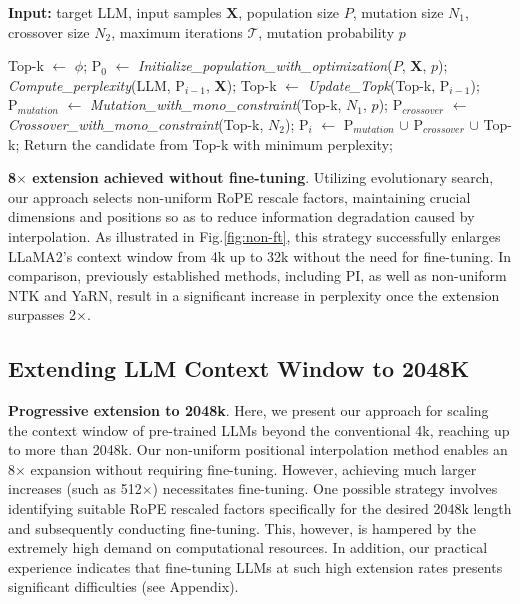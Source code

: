 \begin{algorithm}[t]
	\small
	\caption{The search algorithm}
	\textbf{Input:} target LLM, input samples $\mathbf{X}$, population size $P$, mutation size $N_1$, crossover size $N_2$, maximum iterations $\mathcal{T}$, mutation probability $p$ \\

	\begin{algorithmic}[1]
		\label{alg:search}
		\STATE Top-k $\leftarrow$ $\phi$;
		\STATE $\text{P}_0$ $\leftarrow$ \textit{Initialize\_population\_with\_optimization}($P$, $\mathbf{X}$, $p$);
		\STATE \textit{Compute\_perplexity}(LLM, $\text{P}_{i-1}$, $\mathbf{X}$);
		\STATE Top-k $\leftarrow$ \textit{Update\_Topk}(Top-k, $\text{P}_{i-1}$);
		\STATE $\text{P}_{mutation}$ $\leftarrow$ \textit{Mutation\_with\_mono\_constraint}(Top-k, $N_1$, $p$);
		\STATE $\text{P}_{crossover}$ $\leftarrow$ \textit{Crossover\_with\_mono\_constraint}(Top-k, $N_2$);
		\STATE $\text{P}_i$ $\leftarrow$ $\text{P}_{mutation}$ $\cup$ $\text{P}_{crossover}$ $\cup$ Top-k;
		\ENDFOR
		\STATE Return the candidate from Top-k with minimum perplexity;
	\end{algorithmic}
\end{algorithm}

\textbf{8$\times$ extension achieved without fine-tuning}. Utilizing evolutionary search, our approach selects non-uniform RoPE rescale factors, maintaining crucial dimensions and positions so as to reduce information degradation caused by interpolation. As illustrated in Fig.\ref{fig:non-ft}, this strategy successfully enlarges LLaMA2's context window from 4k up to 32k without the need for fine-tuning. In comparison, previously established methods, including PI, as well as non-uniform NTK and YaRN, result in a significant increase in perplexity once the extension surpasses 2$\times$.

\subsection{Extending LLM Context Window to 2048K}
\label{sec:extendto2048k}

\textbf{Progressive extension to 2048k}. Here, we present our approach for scaling the context window of pre-trained LLMs beyond the conventional 4k, reaching up to more than 2048k. Our non-uniform positional interpolation method enables an 8$\times$ expansion without requiring fine-tuning. However, achieving much larger increases (such as 512$\times$) necessitates fine-tuning. One possible strategy involves identifying suitable RoPE rescaled factors specifically for the desired 2048k length and subsequently conducting fine-tuning. This, however, is hampered by the extremely high demand on computational resources. In addition, our practical experience indicates that fine-tuning LLMs at such high extension rates presents significant difficulties (see Appendix).

